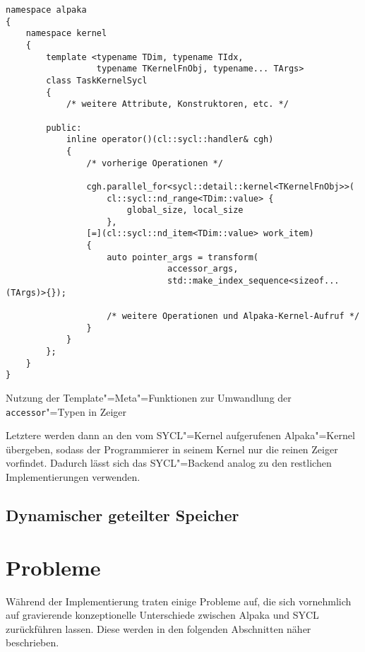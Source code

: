 \begin{code}
    \begin{verbatim}
namespace alpaka
{
    namespace kernel
    {
        template <typename TDim, typename TIdx,
                  typename TKernelFnObj, typename... TArgs>
        class TaskKernelSycl
        {
            /* weitere Attribute, Konstruktoren, etc. */

        public:
            inline operator()(cl::sycl::handler& cgh)
            {
                /* vorherige Operationen */

                cgh.parallel_for<sycl::detail::kernel<TKernelFnObj>>(
                    cl::sycl::nd_range<TDim::value> {
                        global_size, local_size
                    },
                [=](cl::sycl::nd_item<TDim::value> work_item)
                {
                    auto pointer_args = transform(
                                accessor_args,
                                std::make_index_sequence<sizeof...(TArgs)>{});

                    /* weitere Operationen und Alpaka-Kernel-Aufruf */
                }
            }
        };
    }
}
    \end{verbatim}
    \caption{Nutzung der Template"=Meta"=Funktionen zur Umwandlung der
             \texttt{accessor}"=Typen in Zeiger}
    \label{implementierung:besonderheiten:zeiger:acctransusage}
\end{code}
Letztere werden dann an den vom SYCL"=Kernel aufgerufenen
Alpaka"=Kernel übergeben, sodass der Programmierer in seinem Kernel nur die
reinen Zeiger vorfindet. Dadurch lässt sich das SYCL"=Backend analog zu den
restlichen Implementierungen verwenden.

\subsection{Dynamischer geteilter Speicher}
\label{implementierung:besonderheiten:sharedmem}

\section{Probleme}\label{implementierung:probleme}

Während der Implementierung traten einige Probleme auf, die sich vornehmlich
auf gravierende konzeptionelle Unterschiede zwischen Alpaka und SYCL
zurückführen lassen. Diese werden in den folgenden Abschnitten näher
beschrieben.

